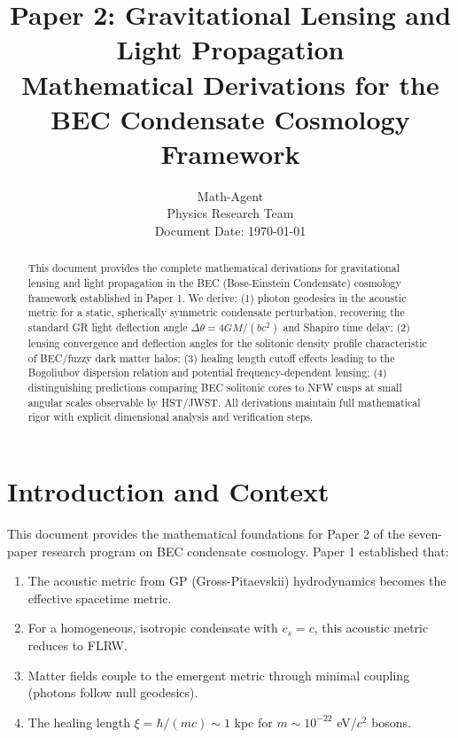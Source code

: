 \documentclass[11pt,a4paper]{article}
\title{\textbf{Paper 2: Gravitational Lensing and Light Propagation}\\[0.5em]
\large Mathematical Derivations for the BEC Condensate Cosmology Framework}
\author{Math-Agent\\
\small Physics Research Team\\
\small Document Date: \today}
\date{}
\newcommand{\cs}{\ensuremath{c_s}}
\theoremstyle{definition}
\theoremstyle{remark}
\begin{document}
\maketitle

\begin{abstract}
This document provides the complete mathematical derivations for gravitational lensing and light propagation in the BEC (Bose-Einstein Condensate) cosmology framework established in Paper 1. We derive: (1) photon geodesics in the acoustic metric for a static, spherically symmetric condensate perturbation, recovering the standard GR light deflection angle $\Delta\theta = 4GM/(bc^2)$ and Shapiro time delay; (2) lensing convergence and deflection angles for the solitonic density profile characteristic of BEC/fuzzy dark matter halos; (3) healing length cutoff effects leading to the Bogoliubov dispersion relation and potential frequency-dependent lensing; (4) distinguishing predictions comparing BEC solitonic cores to NFW cusps at small angular scales observable by HST/JWST. All derivations maintain full mathematical rigor with explicit dimensional analysis and verification steps.
\end{abstract}

\tableofcontents
\newpage

\section{Introduction and Context}
\label{sec:intro}

This document provides the mathematical foundations for Paper 2 of the seven-paper research program on BEC condensate cosmology. Paper 1 established that:

\begin{enumerate}[leftmargin=*, itemsep=0.3em]
\item The acoustic metric from GP (Gross-Pitaevskii) hydrodynamics becomes the effective spacetime metric.
\item For a homogeneous, isotropic condensate with $\cs = c$, this acoustic metric reduces to FLRW.
\item Matter fields couple to the emergent metric through minimal coupling (photons follow null geodesics).
\item The healing length $\xi = \hbar/(mc) \sim 1$ kpc for $m \sim 10^{-22}$ eV/$c^2$ bosons.
\end{enumerate}
\end{document}
